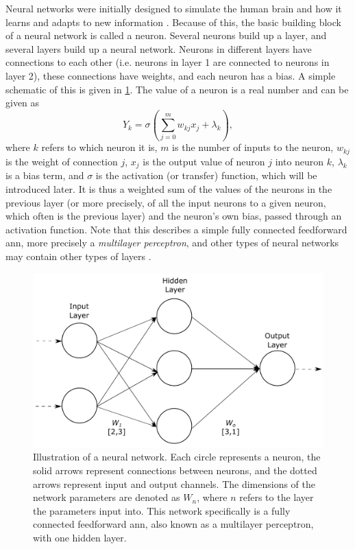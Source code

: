 Neural networks were initially designed to simulate the human brain and how it learns and adapts to new information \cite{McCulloch1943}. Because of this, the basic building block of a neural network is called a neuron. Several neurons build up a layer, and several layers build up a neural network. Neurons in different layers have connections to each other (i.e. neurons in layer 1 are connected to neurons in layer 2), these connections have weights, and each neuron has a bias. A simple schematic of this is given in \cref{fig:neuralnetwork}. The value of a neuron is a real number and can be given as \cite[81]{Wang2003}
\begin{equation}
    \label{eq:neuron}
    Y_{k} = \sigma\left(\sum_{j=0}^{m}w_{kj}x_j + \lambda_k \right),
\end{equation}
where $k$ refers to which neuron it is, $m$ is the number of inputs to the neuron, $w_{kj}$ is the weight of connection $j$, $x_j$ is the output value of neuron $j$ into neuron $k$, $\lambda_k$ is a bias term, and $\sigma$ is the activation (or transfer) function, which will be introduced later. It is thus a weighted sum of the values of the neurons in the previous layer (or more precisely, of all the input neurons to a given neuron, which often is the previous layer) and the neuron's own bias, passed through an activation function. Note that this describes a simple fully connected feedforward \gls{ann}, more precisely a \textit{multilayer perceptron}, and other types of neural networks may contain other types of layers \cite{Wang2003}. 

\begin{figure}[htbp]  
    \centering
    \includegraphics[width=.8\textwidth]{figures/neuralnetwork.pdf}
    \caption[Illustration of a neural network]{Illustration of a neural network. Each circle represents a neuron, the solid arrows represent connections between neurons, and the dotted arrows represent input and output channels. The dimensions of the network parameters are denoted as $W_n$, where $n$ refers to the layer the parameters input into. This network specifically is a fully connected feedforward \gls{ann}, also known as a multilayer perceptron, with one hidden layer. }
    \label{fig:neuralnetwork}
\end{figure}

